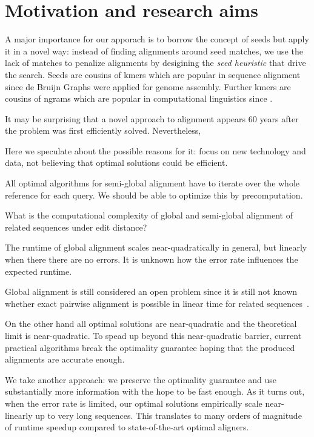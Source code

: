 \section*{Motivation and research aims}

A major importance for our apporach is to borrow the concept of seeds but apply
it in a novel way: instead of finding alignments around seed matches, we use the
lack of matches to penalize alignments by desigining the \emph{seed heuristic}
that drive the \A search. Seeds are cousins of kmers which are popular in
sequence alignment since de Bruijn Graphs were applied for genome assembly.
Further kmers are cousins of ngrams which are popular in computational
linguistics since .

It may be surprising that a novel approach to alignment appears 60 years after
the problem was first efficiently solved. Nevertheless, 

Here we speculate about the possible
reasons for it: focus on new technology and data, not believing that optimal
solutions could be efficient.


All optimal algorithms for semi-global alignment have to iterate over the whole
reference for each query. We should be able to optimize this by precomputation.

\begin{problem}
    What is the computational complexity of global and semi-global alignment of
    related sequences under edit distance?
\end{problem}

The runtime of global alignment scales near-quadratically in general, but
linearly when there there are no errors. It is unknown how the error rate
influences the expected runtime.

Global alignment is still considered an open problem since it is still not known
whether exact pairwise alignment is possible in linear time for related
sequences~\citep{medvedev2022theoretical}. 

On the other hand all optimal solutions are near-quadratic and the theoretical
limit is near-quadratic. To spead up beyond this near-quadratic barrier, current
practical algorithms break the optimality guarantee hoping that the produced
alignments are accurate enough. 

We take another approach: we preserve the optimality guarantee and use
substantially more information with the hope to be fast enough. As it turns out,
when the error rate is limited, our optimal solutions empirically scale
near-linearly up to very long sequences. This translates to many orders of
magnitude of runtime speedup compared to state-of-the-art optimal aligners.

